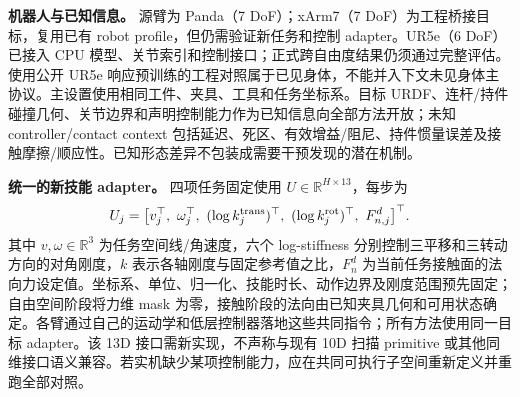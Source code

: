 \documentclass[11pt]{article}
\newcommand{\R}{\mathbb R}
\begin{document}
\textbf{机器人与已知信息。} 源臂为 Panda（7 DoF）；xArm7（7 DoF）为工程桥接目标，复用已有 robot profile，但仍需验证新任务和控制 adapter。UR5e（6 DoF）已接入 CPU 模型、关节索引和控制接口；正式跨自由度结果仍须通过完整评估。使用公开 UR5e 响应预训练的工程对照属于已见身体，不能并入下文未见身体主协议。主设置使用相同工件、夹具、工具和任务坐标系。目标 URDF、连杆/持件碰撞几何、关节边界和声明控制能力作为已知信息向全部方法开放；未知 controller/contact context 包括延迟、死区、有效增益/阻尼、持件惯量误差及接触摩擦/顺应性。已知形态差异不包装成需要干预发现的潜在机制。

\textbf{统一的新技能 adapter。} 四项任务固定使用 $U\in\R^{H\times13}$，每步为
\begin{equation}
 U_j=\big[v_j^\top,\ \omega_j^\top,\
 (\log k^{\rm trans}_j)^\top,\
 (\log k^{\rm rot}_j)^\top,\ F^d_{n,j}\big]^\top.
 \label{eq:experimentalprimitive}
\end{equation}
其中 $v,\omega\in\R^3$ 为任务空间线/角速度，六个 log-stiffness 分别控制三平移和三转动方向的对角刚度，$k$ 表示各轴刚度与固定参考值之比，$F_n^d$ 为当前任务接触面的法向力设定值。坐标系、单位、归一化、技能时长、动作边界及刚度范围预先固定；自由空间阶段将力维 mask 为零，接触阶段的法向由已知夹具几何和可用状态确定。各臂通过自己的运动学和低层控制器落地这些共同指令；所有方法使用同一目标 adapter。该 13D 接口需新实现，不声称与现有 10D 扫描 primitive 或其他同维接口语义兼容。若实机缺少某项控制能力，应在共同可执行子空间重新定义并重跑全部对照。
\end{document}

